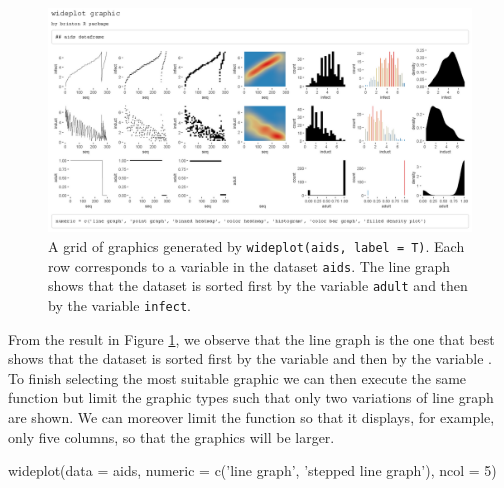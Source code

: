 \begin{Schunk}
	\begin{figure}[H]
\includegraphics[width=0.9\linewidth]{figures/wideplot_aids0} \caption[Output of 'wideplot(aids, label = T)']{A grid of graphics generated by \texttt{wideplot(aids, label = T)}. Each row corresponds to a variable in the dataset \texttt{aids}. The line graph shows that the dataset is sorted first by the variable \texttt{adult} and then by the variable \texttt{infect}.}\label{fig:wideplotaids1}
	\end{figure}
\end{Schunk}

From the result in Figure \ref{fig:wideplotaids1}, we observe that the line graph is the one that best
shows that the dataset is sorted first by the variable  and
then by the variable . To finish selecting the most
suitable graphic we can then execute the same function but limit the
graphic types such that only two variations of line graph are shown. We
can moreover limit the function so that it displays, for example, only
five columns, so that the graphics will be larger.

\begin{example}
  wideplot(data = aids, 
           numeric = c('line graph', 'stepped line graph'), ncol = 5)
\end{example}

